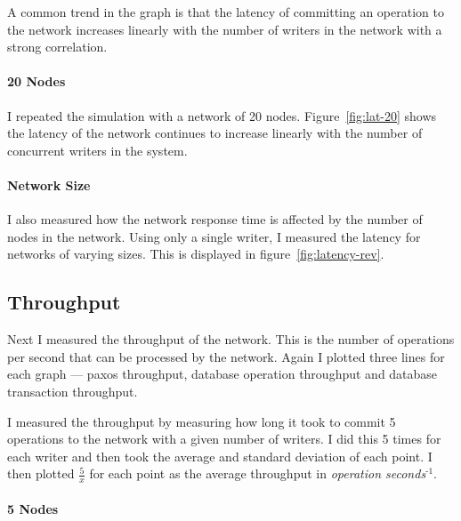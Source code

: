 \documentclass[12pt,twoside,notitlepage]{report}
\newcommand{\superscript}[1]{\ensuremath{^{\textrm{#1}}}}
\begin{document}
A common trend in the graph is that the latency of committing an operation to the
network increases linearly with the number of writers in the network with a strong
correlation.

\paragraph{20 Nodes}

I repeated the simulation with a network of 20 nodes. Figure~\ref{fig:lat-20} shows
the latency of the network continues to increase linearly with the number of concurrent writers in
the system.

\paragraph{Network Size}

I also measured how the network response time is affected by the number of nodes in the network.
Using only a single writer, I measured the latency for networks of varying sizes. This is
displayed in figure~\ref{fig:latency-rev}.

\subsection{Throughput}

\begin{figure}[Hp]
\centering
{}
\end{figure}

Next I measured the throughput of the network. This is the number of operations per second that
can be processed by the network. Again I plotted three lines for each graph --- paxos throughput,
database operation throughput and database transaction throughput.

I measured the throughput by measuring how long it took to commit 5 operations to the network with
a given number of writers. I did this 5 times for each writer and then took the average and
standard deviation of each point. I then plotted $\frac{5}{x}$ for each point as the average throughput in
\emph{operation seconds\superscript{-1}}.

\paragraph{5 Nodes}
\end{document}
